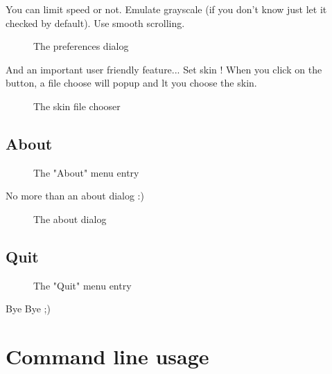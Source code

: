 \documentclass[10pt]{report}
\begin{document}
You can limit speed or not.\newline
Emulate grayscale (if you don't know just let it checked by default).\newline
Use smooth scrolling.\newline
\begin{figure}[H]
\centering
{}
\caption{The preferences dialog}
\end{figure}
And an important user friendly feature...\newline
Set skin !\newline
When you click on the button, a file choose will popup and lt you choose the skin.\newline
\begin{figure}[H]
\centering
{}
\caption{The skin file chooser}
\end{figure}

\section{About}

\begin{figure}[H]
\centering
{}
\caption{The "About" menu entry}
\end{figure}
No more than an about dialog :)\newline

\begin{figure}[H]
\centering
{}
\caption{The about dialog}
\end{figure}

\section{Quit}

\begin{figure}[H]
\centering
{}
\caption{The "Quit" menu entry}
\end{figure}
Bye Bye ;)

\chapter{Command line usage}
\end{document}
